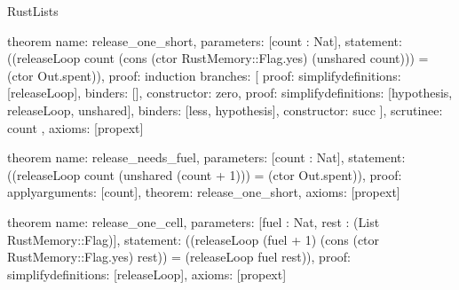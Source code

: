 \begin{lexlean}{RustLists}
\begin{semanticmodule}
theorem{
  name: release_one_short,
  parameters: [count : Nat],
  statement: ((releaseLoop count (cons (ctor RustMemory::Flag.yes) (unshared count))) = (ctor Out.spent)),
  proof: induction{
    branches: [
      {proof: simplify{definitions: [releaseLoop]}, binders: [], constructor: zero},
      {
        proof: simplify{definitions: [hypothesis, releaseLoop, unshared]},
        binders: [less, hypothesis],
        constructor: succ
      }
    ],
    scrutinee: count
  },
  axioms: [propext]
}

theorem{
  name: release_needs_fuel,
  parameters: [count : Nat],
  statement: ((releaseLoop count (unshared (count + 1))) = (ctor Out.spent)),
  proof: apply{arguments: [count], theorem: release_one_short},
  axioms: [propext]
}

theorem{
  name: release_one_cell,
  parameters: [fuel : Nat, rest : (List RustMemory::Flag)],
  statement: ((releaseLoop (fuel + 1) (cons (ctor RustMemory::Flag.yes) rest)) = (releaseLoop fuel rest)),
  proof: simplify{definitions: [releaseLoop]},
  axioms: [propext]
}
\end{semanticmodule}
\end{lexlean}
